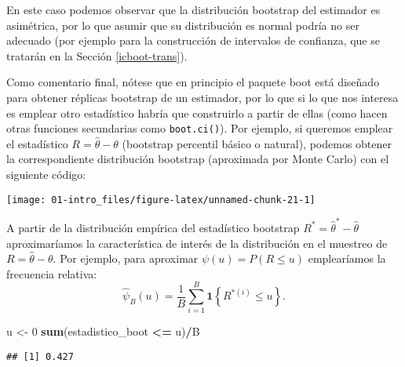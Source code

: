 \documentclass[]{book}
\newenvironment{Shaded}{\begin{snugshade}}{\end{snugshade}}
\newcommand{\KeywordTok}[1]{\textcolor[rgb]{0.13,0.29,0.53}{\textbf{#1}}}
\newcommand{\DecValTok}[1]{\textcolor[rgb]{0.00,0.00,0.81}{#1}}
\newcommand{\StringTok}[1]{\textcolor[rgb]{0.31,0.60,0.02}{#1}}
\newcommand{\OperatorTok}[1]{\textcolor[rgb]{0.81,0.36,0.00}{\textbf{#1}}}
\newcommand{\NormalTok}[1]{#1}
\theoremstyle{break}
\theoremstyle{definition}
\theoremstyle{definition}
\theoremstyle{definition}
\theoremstyle{remark}
\begin{document}
En este caso podemos observar que la distribución bootstrap del
estimador es asimétrica, por lo que asumir que su distribución es normal
podría no ser adecuado (por ejemplo para la construcción de intervalos
de confianza, que se tratarán en la Sección \ref{icboot-trans}).

Como comentario final, nótese que en principio el paquete boot está
diseñado para obtener réplicas bootstrap de un estimador, por lo que si
lo que nos interesa es emplear otro estadístico habría que construirlo a
partir de ellas (como hacen otras funciones secundarias como
\texttt{boot.ci()}). Por ejemplo, si queremos emplear el estadístico
\(R = \hat \theta - \theta\) (bootstrap percentil básico o natural),
podemos obtener la correspondiente distribución bootstrap (aproximada
por Monte Carlo) con el siguiente código:

\begin{Shaded}
\end{Shaded}

\begin{center}\texttt{[image: 01-intro\_files/figure-latex/unnamed-chunk-21-1]} \end{center}

A partir de la distribución empírica del estadístico bootstrap
\(R^{\ast} = \hat \theta^{\ast} - \hat \theta\) aproximaríamos la
característica de interés de la distribución en el muestreo de
\(R = \hat \theta - \theta\). Por ejemplo, para aproximar
\(\psi \left( u \right) =P\left( R\leq u \right)\) emplearíamos la
frecuencia relativa: \[\hat{\psi}_{B}\left( u \right) =
\frac{1}{B}\sum_{i=1}^{B}\mathbf{1}\left\{ R^{\ast (i)}\leq u\right\}.\]

\begin{Shaded}
\begin{Highlighting}[]
\NormalTok{u <-}\StringTok{ }\DecValTok{0}
\KeywordTok{sum}\NormalTok{(estadistico_boot }\OperatorTok{<=}\StringTok{ }\NormalTok{u)}\OperatorTok{/}\NormalTok{B}
\end{Highlighting}
\end{Shaded}

\begin{verbatim}
## [1] 0.427
\end{verbatim}
\end{document}
